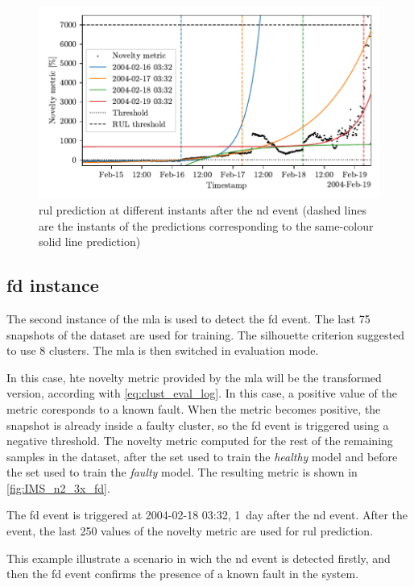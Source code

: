 \begin{figure}
    \centering
    \includegraphics[width=\textwidth]{images/IMS/Test02/RUL.pdf}
    \caption{\gls{rul} prediction at different instants after the \gls{nd} event (dashed lines are the instants of the predictions corresponding to the same-colour solid line prediction)}
    \label{fig:IMS_n2_3x_prediction}
\end{figure}

\subsection{\gls{fd} instance}
The second instance of the \gls{mla} is used to detect the \gls{fd} event. The last 75 snapshots of the dataset are used for training. The silhouette criterion suggested to use 8 clusters. The \gls{mla} is then switched in evaluation mode. 

In this case, hte novelty metric provided by the \gls{mla} will be the transformed version, according with \autoref{eq:clust_eval_log}. In this case, a positive value of the metric coresponds to a known fault. When the metric becomes positive, the snapshot is already inside a faulty cluster, so the \gls{fd} event is triggered using a negative threshold. The novelty metric computed for the rest of the remaining samples in the dataset, after the set used to train the \emph{healthy} model and before the set used to train the \emph{faulty} model. The resulting metric is shown in \autoref{fig:IMS_n2_3x_fd}.

The \gls{fd} event is triggered at 2004-02-18 03:32, 1~day after the \gls{nd} event. After the event, the last 250 values of the novelty metric are used for \gls{rul} prediction. 

This example illustrate a scenario in wich the \gls{nd} event is detected firstly, and then the \gls{fd} event confirms the presence of a known fault in the system.

